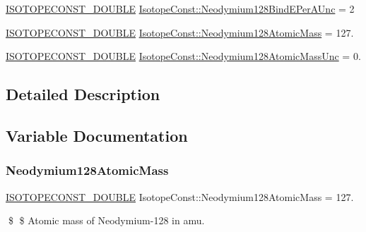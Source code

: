 \begin{DoxyCompactItemize}
\mbox{\hyperlink{group___isotope_const-_macros_ga8f45a7272ce02c0b4c65c44636ed719a}{I\+S\+O\+T\+O\+P\+E\+C\+O\+N\+S\+T\+\_\+\+D\+O\+U\+B\+LE}} \mbox{\hyperlink{group___isotope_const-_neodymium-_nd128_ga9466ed8ccb9a64ddd519e4d9e3f4350d}{Isotope\+Const\+::\+Neodymium128\+Bind\+E\+Per\+A\+Unc}} = 2
\item 
\mbox{\hyperlink{group___isotope_const-_macros_ga8f45a7272ce02c0b4c65c44636ed719a}{I\+S\+O\+T\+O\+P\+E\+C\+O\+N\+S\+T\+\_\+\+D\+O\+U\+B\+LE}} \mbox{\hyperlink{group___isotope_const-_neodymium-_nd128_gaf80cdb72ae210875a9fbb61e1e06f307}{Isotope\+Const\+::\+Neodymium128\+Atomic\+Mass}} = 127.
\item 
\mbox{\hyperlink{group___isotope_const-_macros_ga8f45a7272ce02c0b4c65c44636ed719a}{I\+S\+O\+T\+O\+P\+E\+C\+O\+N\+S\+T\+\_\+\+D\+O\+U\+B\+LE}} \mbox{\hyperlink{group___isotope_const-_neodymium-_nd128_gad491b034f0d71cde33968382c22f16a4}{Isotope\+Const\+::\+Neodymium128\+Atomic\+Mass\+Unc}} = 0.
\end{DoxyCompactItemize}


\subsection{Detailed Description}


\subsection{Variable Documentation}
\mbox{\label{group___isotope_const-_neodymium-_nd128_gaf80cdb72ae210875a9fbb61e1e06f307}} 
\subsubsection{\texorpdfstring{Neodymium128\+Atomic\+Mass}{Neodymium128AtomicMass}}
{\footnotesize\ttfamily \mbox{\hyperlink{group___isotope_const-_macros_ga8f45a7272ce02c0b4c65c44636ed719a}{I\+S\+O\+T\+O\+P\+E\+C\+O\+N\+S\+T\+\_\+\+D\+O\+U\+B\+LE}} Isotope\+Const\+::\+Neodymium128\+Atomic\+Mass = 127.}

\$ \$ Atomic mass of Neodymium-\/128 in amu. \mbox{\label{group___isotope_const-_neodymium-_nd128_gad491b034f0d71cde33968382c22f16a4}} 
